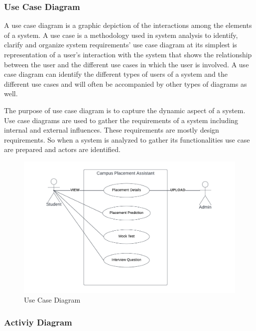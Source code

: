 \documentclass[12pt]{article}
\begin{document}
\begin{enumerate}
\newpage
\subsubsection{Use Case Diagram}

A use case diagram is a graphic depiction of the interactions among the
elements of a system. A use case is a methodology used in system analysis
to identify, clarify and organize system requirements’ use case diagram at its
simplest is representation of a user's interaction with the system that shows the
relationship between the user and the different use cases in which the user is
involved. A use case diagram can identify the different types of users of a system
and the different use cases and will often be accompanied by other types of
diagrams as well.
\par The purpose of use case diagram is to capture the dynamic aspect of a
system. Use case diagrams are used to gather the requirements of a system
including internal and external influences. These requirements are mostly design
requirements. So when a system is analyzed to gather its functionalities use case
are prepared and actors are identified.


\begin{figure}[h!]
\begin{center}
\includegraphics[scale=.3]{use case diagram}
\caption{Use Case Diagram}
\end{center}
\end{figure}

\newpage
\subsubsection{Activiy Diagram}



\end{enumerate}
\end{document}
